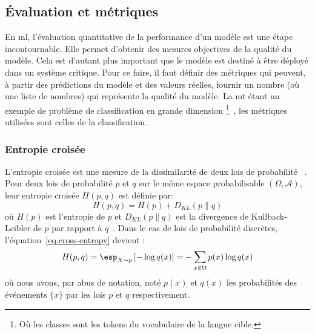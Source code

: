 \subsection{Évaluation et métriques}

En \gls{ml}, l'évaluation quantitative de la performance d'un modèle est une étape incontournable.
Elle permet d'obtenir des mesures objectives de la qualité du modèle.
Cela est d'autant plus important que le modèle est destiné à être déployé dans un système critique.
Pour ce faire, il faut définir des métriques qui peuvent, 
à partir des prédictions du modèle et des valeurs réelles,
fournir un nombre (où une liste de nombres) qui représente la qualité du modèle.
La \gls{mt} étant un exemple de problème de classification en grande dimension%
\footnote{
Où les classes sont les tokens du vocabulaire de la langue cible.
}~\cite{deep-nmt-survey},
les métriques utilisées sont celles de la classification.

\subsubsection{Entropie croisée}

L'entropie croisée est une mesure de la dissimilarité de deux lois de probabilité%
~\cite{Vasilev_Slater_Spacagna_Roelants_Zocca_2019}.
Pour deux lois de probabilité \(p\) et \(q\) sur le même espace probabilisable \((\Omega, \mathcal{A})\),
leur entropie croisée \(H(p, q)\) est définie par:
\begin{equation}
    \label{eq.cross-entropy}
    H(p, q) = H(p) + D_{KL}(p \parallel q)
\end{equation}
où \(H(p)\) est l'entropie de \(p\) 
et \(D_{KL}(p \parallel q)\) est la divergence de Kullback-Leibler de \(p\) par rapport à \(q\)~\cite{Bishop_2006}.
Dans le cas de lois de probabilité discrètes, l'équation~\ref{eq.cross-entropy} devient :
\begin{equation}
    \label{eq.cross-entropy-discrete}
    H(p, q) = \esp_{X \sim p} \left[ - \log q(x) \right]
    = - \sum_{x \in \Omega} p(x) \log q(x)
\end{equation}
où nous avons, par abus de notation, noté \(p(x)\) et \(q(x)\) 
les probabilités des événements \(\{x\}\) par les lois \(p\) et \(q\) respectivement.

